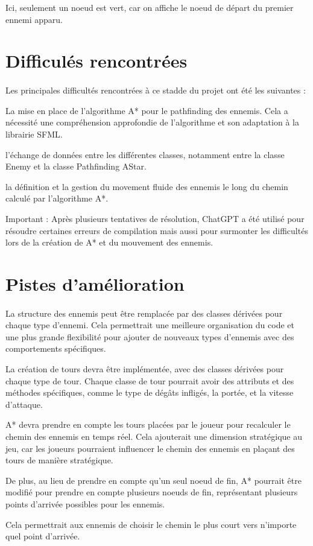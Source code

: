 \documentclass{article}
\begin{document}
Ici, seulement un noeud est vert, car on affiche le noeud de départ du premier ennemi apparu.


\section{Difficulés rencontrées}
\paragraph{}
Les principales difficultés rencontrées à ce stadde du projet ont été les suivantes :


\item La mise en place de l'algorithme A* pour le pathfinding des ennemis. Cela a nécessité une compréhension approfondie de l'algorithme et son adaptation à la librairie SFML.
\item l'échange de données entre les différentes classes, notamment entre la classe Enemy et la classe Pathfinding AStar.
\item la définition et la gestion du movement fluide des ennemis le long du chemin calculé par l'algorithme A*.

Important : Après plusieurs tentatives de résolution, ChatGPT a été utilisé pour résoudre certaines erreurs de compilation mais aussi pour surmonter les difficultés lors de la création de A* et du mouvement des ennemis.

\section{Pistes d'amélioration}
\paragraph{}

La structure des ennemis peut être remplacée par des classes dérivées pour chaque type d'ennemi. Cela permettrait une meilleure organisation du code et une plus grande flexibilité pour ajouter de nouveaux types d'ennemis avec des comportements spécifiques.


La création de tours devra être implémentée, avec des classes dérivées pour chaque type de tour. Chaque classe de tour pourrait avoir des attributs et des méthodes spécifiques, comme le type de dégâts infligés, la portée, et la vitesse d'attaque.


A* devra prendre en compte les tours placées par le joueur pour recalculer le chemin des ennemis en temps réel. Cela ajouterait une dimension stratégique au jeu, car les joueurs pourraient influencer le chemin des ennemis en plaçant des tours de manière stratégique.

De plus, au lieu de prendre en compte qu'un seul noeud de fin, A* pourrait être modifié pour prendre en compte plusieurs noeuds de fin, représentant plusieurs points d'arrivée possibles pour les ennemis.

Cela permettrait aux ennemis de choisir le chemin le plus court vers n'importe quel point d'arrivée.

\newpage
\end{document}
